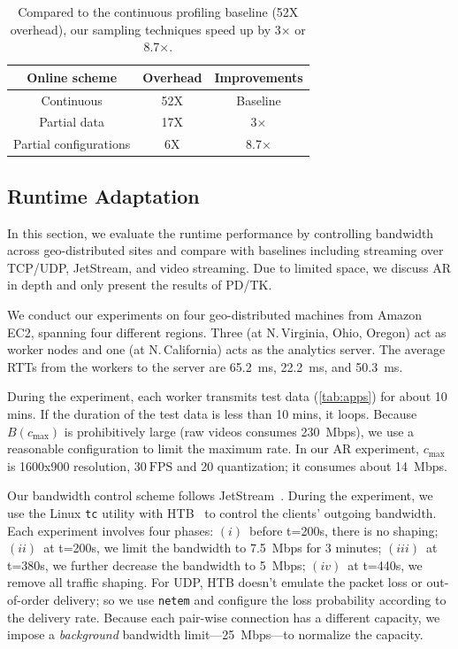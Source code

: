 \begin{table}[t]
  \small
  \centering
  \begin{tabular}{c c c}
    \toprule
    Online scheme & Overhead & Improvements \\
    \midrule
    Continuous & 52X & Baseline \\
    Partial data & 17X & 3$\times$\\
    Partial configurations & 6X & 8.7$\times$ \\
    \bottomrule
  \end{tabular}
  \vspace{0.5em}
  \caption{Compared to the continuous profiling baseline (52X overhead), our
    sampling techniques speed up by 3$\times$ or 8.7$\times$.}
  \label{tab:online}
  \vspace{-1em}
\end{table}

\subsection{Runtime Adaptation}
\label{sec:runtime-adaptation}

In this section, we evaluate the runtime performance by controlling bandwidth
across geo-distributed sites and compare \sysname{} with baselines including
streaming over TCP/UDP, JetStream, and video streaming. Due to limited space, we
discuss AR in depth and only present the results of PD/TK.

 We conduct our experiments on four geo-distributed
machines from Amazon EC2, spanning four different regions. Three (at
N.\,Virginia, Ohio, Oregon) act as worker nodes and one (at N.\,California) acts
as the analytics server. The average RTTs from the workers to the server are
\SI{65.2}{\ms}, \SI{22.2}{\ms}, and \SI{50.3}{ms}.

During the experiment, each worker transmits test data (\autoref{tab:apps}) for
about 10 mins. If the duration of the test data is less than 10 mins, it
loops. Because $B(c_{\max})$ is prohibitively large (raw videos consumes
\SI{230}{Mbps}), we use a reasonable configuration to limit the maximum rate. In
our AR experiment, $c_{\max}$ is 1600x900 resolution, \(30~\text{FPS}\) and 20
quantization; it consumes about \SI{14}{Mbps}.

Our bandwidth control scheme follows JetStream~\cite{rabkin2014aggregation}.
During the experiment, we use the Linux \texttt{tc} utility with HTB~\cite{htb,
  lartc} to control the clients' outgoing bandwidth. Each experiment involves
four phases: $(i)$~before t=200s, there is no shaping; $(ii)$~at t=200s, we
limit the bandwidth to \SI{7.5}{Mbps} for 3 minutes; $(iii)$~at t=380s, we
further decrease the bandwidth to \SI{5}{Mbps}; $(iv)$~at t=440s, we remove all
traffic shaping. For UDP, HTB doesn't emulate the packet loss or out-of-order
delivery; so we use \texttt{netem} and configure the loss probability according
to the delivery rate. Because each pair-wise connection has a different
capacity, we impose a \textit{background} bandwidth limit---\SI{25}{Mbps}---to
normalize the capacity.

